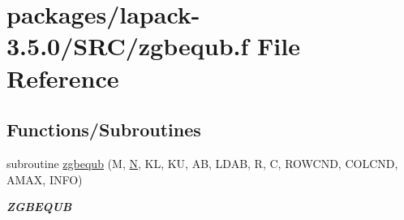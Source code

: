 \hypertarget{zgbequb_8f}{}\section{packages/lapack-\/3.5.0/\+S\+R\+C/zgbequb.f File Reference}
\label{zgbequb_8f}
\subsection*{Functions/\+Subroutines}
\begin{DoxyCompactItemize}
\item 
subroutine \hyperlink{group__complex16GBcomputational_ga7c97209b521bc4c556f7aac044adba00}{zgbequb} (M, \hyperlink{polmisc_8c_a0240ac851181b84ac374872dc5434ee4}{N}, K\+L, K\+U, A\+B, L\+D\+A\+B, R, C, R\+O\+W\+C\+N\+D, C\+O\+L\+C\+N\+D, A\+M\+A\+X, I\+N\+F\+O)
\begin{DoxyCompactList}\small\item\em {\bfseries Z\+G\+B\+E\+Q\+U\+B} \end{DoxyCompactList}\end{DoxyCompactItemize}
